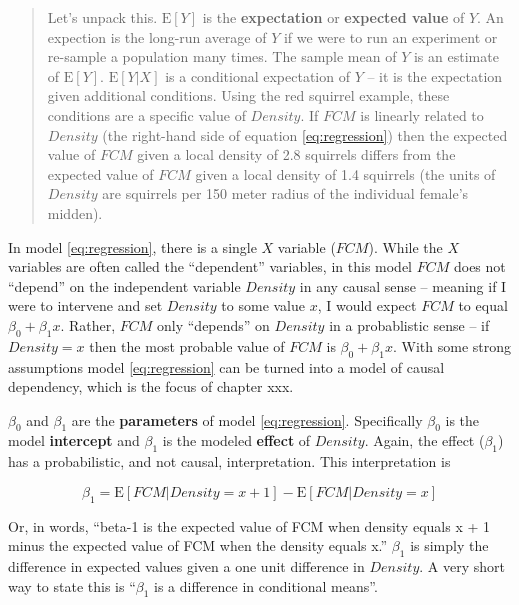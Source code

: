 \documentclass[]{book}
\theoremstyle{definition}
\theoremstyle{definition}
\theoremstyle{definition}
\theoremstyle{remark}
\begin{document}
\begin{quote}
Let's unpack this. \(\textrm{E}[Y]\) is the \textbf{expectation} or
\textbf{expected value} of \(Y\). An expection is the long-run average
of \(Y\) if we were to run an experiment or re-sample a population many
times. The sample mean of \(Y\) is an estimate of \(\textrm{E}[Y]\).
\(\textrm{E}[Y|X]\) is a conditional expectation of \(Y\) -- it is the
expectation given additional conditions. Using the red squirrel example,
these conditions are a specific value of \(Density\). If \(FCM\) is
linearly related to \(Density\) (the right-hand side of equation
\eqref{eq:regression}) then the expected value of \(FCM\) given a local
density of 2.8 squirrels differs from the expected value of \(FCM\)
given a local density of 1.4 squirrels (the units of \(Density\) are
squirrels per 150 meter radius of the individual female's midden).
\end{quote}

In model \eqref{eq:regression}, there is a single \(X\) variable
(\(FCM\)). While the \(X\) variables are often called the ``dependent''
variables, in this model \(FCM\) does not ``depend'' on the independent
variable \(Density\) in any causal sense -- meaning if I were to
intervene and set \(Density\) to some value \(x\), I would expect
\(FCM\) to equal \(\beta_0 + \beta_1 x\). Rather, \(FCM\) only
``depends'' on \(Density\) in a probablistic sense -- if \(Density = x\)
then the most probable value of \(FCM\) is \(\beta_0 + \beta_1 x\). With
some strong assumptions model \eqref{eq:regression} can be turned into a
model of causal dependency, which is the focus of chapter xxx.

\(\beta_0\) and \(\beta_1\) are the \textbf{parameters} of model
\eqref{eq:regression}. Specifically \(\beta_0\) is the model
\textbf{intercept} and \(\beta_1\) is the modeled \textbf{effect} of
\(Density\). Again, the effect (\(\beta_1\)) has a probabilistic, and
not causal, interpretation. This interpretation is

\begin{equation}
\beta_1 = \textrm{E}[FCM|Density=x+1] - \textrm{E}[FCM|Density=x] 
\label{eq:beta1}
\end{equation}

Or, in words, ``beta-1 is the expected value of FCM when density equals
x + 1 minus the expected value of FCM when the density equals x.''
\(\beta_1\) is simply the difference in expected values given a one unit
difference in \(Density\). A very short way to state this is
``\(\beta_1\) is a difference in conditional means''.
\end{document}
